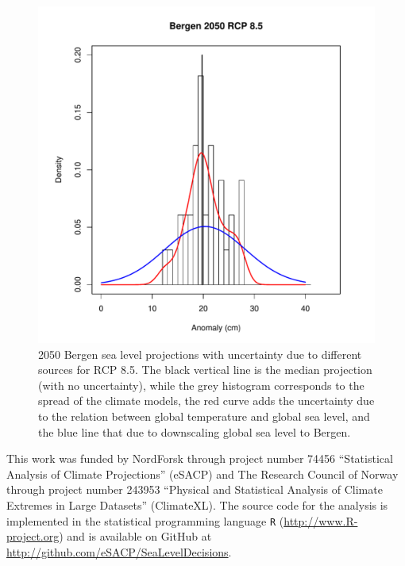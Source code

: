 \documentclass[draft,linenumbers]{agujournal}
\begin{document}
\begin{figure}[!hbpt]
\begin{center}
\includegraphics[width=0.5\linewidth]{unc.pdf}
\caption{2050 Bergen sea level projections with uncertainty due to different sources for RCP 8.5. The black vertical line is the median projection (with no uncertainty), while the grey histogram corresponds to the spread of the climate models, the red curve adds the uncertainty due to the relation between global temperature and global sea level, and the blue line that due to downscaling global sea level to Bergen. } 
\label{fig:unc}
\end{center}
\end{figure}





\begin{acknowledgments}
This work was funded by NordForsk through project number 74456 ``Statistical Analysis of Climate Projections'' (eSACP) and The Research Council of Norway through project number 243953 ``Physical and Statistical Analysis of Climate Extremes in Large Datasets'' (ClimateXL). The source code for the analysis is implemented in the statistical programming language {\tt R} (\url{http://www.R-project.org}) and is available on GitHub at \url{http://github.com/eSACP/SeaLevelDecisions}.
\end{acknowledgments}








\end{document}
